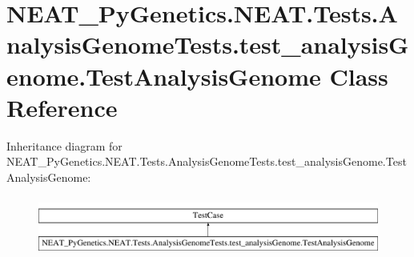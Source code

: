 \hypertarget{class_n_e_a_t___py_genetics_1_1_n_e_a_t_1_1_tests_1_1_analysis_genome_tests_1_1test__analysis_genome_1_1_test_analysis_genome}{}\section{N\+E\+A\+T\+\_\+\+Py\+Genetics.\+N\+E\+A\+T.\+Tests.\+Analysis\+Genome\+Tests.\+test\+\_\+analysis\+Genome.\+Test\+Analysis\+Genome Class Reference}
\label{class_n_e_a_t___py_genetics_1_1_n_e_a_t_1_1_tests_1_1_analysis_genome_tests_1_1test__analysis_genome_1_1_test_analysis_genome}
Inheritance diagram for N\+E\+A\+T\+\_\+\+Py\+Genetics.\+N\+E\+A\+T.\+Tests.\+Analysis\+Genome\+Tests.\+test\+\_\+analysis\+Genome.\+Test\+Analysis\+Genome\+:\begin{figure}[H]
\begin{center}
\leavevmode
\includegraphics[height=1.985816cm]{class_n_e_a_t___py_genetics_1_1_n_e_a_t_1_1_tests_1_1_analysis_genome_tests_1_1test__analysis_genome_1_1_test_analysis_genome}
\end{center}
\end{figure}
